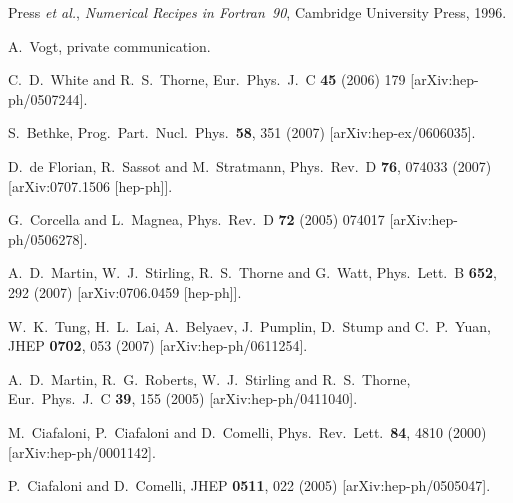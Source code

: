 \documentclass[12pt]{article}
\begin{document}
\begin{thebibliography}{99}
  Press {\it et al.}, \emph{Numerical Recipes in Fortran~90},
  Cambridge University Press, 1996.
  
 A.~Vogt, private communication.


  C.~D.~White and R.~S.~Thorne,
  Eur.\ Phys.\ J.\ C {\bf 45} (2006) 179
  [arXiv:hep-ph/0507244].

  S.~Bethke,
  Prog.\ Part.\ Nucl.\ Phys.\  {\bf 58}, 351 (2007)
  [arXiv:hep-ex/0606035].

  D.~de Florian, R.~Sassot and M.~Stratmann,
  Phys.\ Rev.\  D {\bf 76}, 074033 (2007)
  [arXiv:0707.1506 [hep-ph]].


  G.~Corcella and L.~Magnea,
  Phys.\ Rev.\  D {\bf 72} (2005) 074017
  [arXiv:hep-ph/0506278].

  A.~D.~Martin, W.~J.~Stirling, R.~S.~Thorne and G.~Watt,
  Phys.\ Lett.\  B {\bf 652}, 292 (2007)
  [arXiv:0706.0459 [hep-ph]].

  W.~K.~Tung, H.~L.~Lai, A.~Belyaev, J.~Pumplin, D.~Stump and C.~P.~Yuan,
  JHEP {\bf 0702}, 053 (2007)
  [arXiv:hep-ph/0611254].

  A.~D.~Martin, R.~G.~Roberts, W.~J.~Stirling and R.~S.~Thorne,
  Eur.\ Phys.\ J.\  C {\bf 39}, 155 (2005)
  [arXiv:hep-ph/0411040].

  M.~Ciafaloni, P.~Ciafaloni and D.~Comelli,
  Phys.\ Rev.\ Lett.\  {\bf 84}, 4810 (2000)
  [arXiv:hep-ph/0001142].


  P.~Ciafaloni and D.~Comelli,
  JHEP {\bf 0511}, 022 (2005)
  [arXiv:hep-ph/0505047].



\end{thebibliography}
\end{document}
